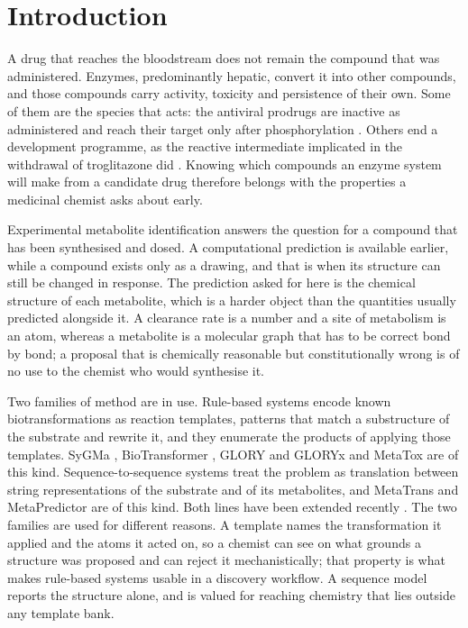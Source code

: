 \section{Introduction}

A drug that reaches the bloodstream does not remain the compound that was administered. Enzymes,
predominantly hepatic, convert it into other compounds, and those compounds carry activity,
toxicity and persistence of their own. Some of them are the species that acts: the antiviral
prodrugs are inactive as administered and reach their target only after phosphorylation
\citep{To_2023}. Others end a development programme, as the reactive intermediate implicated in
the withdrawal of troglitazone did \citep{Ikeda_2011}. Knowing which compounds an enzyme system
will make from a candidate drug therefore belongs with the properties a medicinal chemist asks
about early.

Experimental metabolite identification answers the question for a compound that has been
synthesised and dosed. A computational prediction is available earlier, while a compound exists
only as a drawing, and that is when its structure can still be changed in response. The
prediction asked for here is the chemical structure of each metabolite, which is a harder object
than the quantities usually predicted alongside it. A clearance rate is a number and a site of
metabolism is an atom, whereas a metabolite is a molecular graph that has to be correct bond by
bond; a proposal that is chemically reasonable but constitutionally wrong is of no use to the
chemist who would synthesise it.

Two families of method are in use. Rule-based systems encode known biotransformations as reaction
templates, patterns that match a substructure of the substrate and rewrite it, and they enumerate
the products of applying those templates. SyGMa \citep{Ridder_2008}, BioTransformer
\citep{Djoumbou_Feunang_2019}, GLORY and GLORYx \citep{de_Bruyn_Kops_2019, de_Bruyn_Kops_2020} and
MetaTox \citep{Rudik_2017} are of this kind. Sequence-to-sequence systems treat the problem as
translation between string representations of the substrate and of its metabolites, and MetaTrans
\citep{Litsa_2020} and MetaPredictor \citep{Zhu_2024} are of this kind. Both lines have been
extended recently \citep{Larsson_2025, Zhou_2025, Zhou_2026, Chavan_2026}. The two families are
used for different reasons. A template names the transformation it applied and the atoms it acted
on, so a chemist can see on what grounds a structure was proposed and can reject it mechanistically;
that property is what makes rule-based systems usable in a discovery workflow. A sequence model
reports the structure alone, and is valued for reaching chemistry that lies outside any template
bank.

